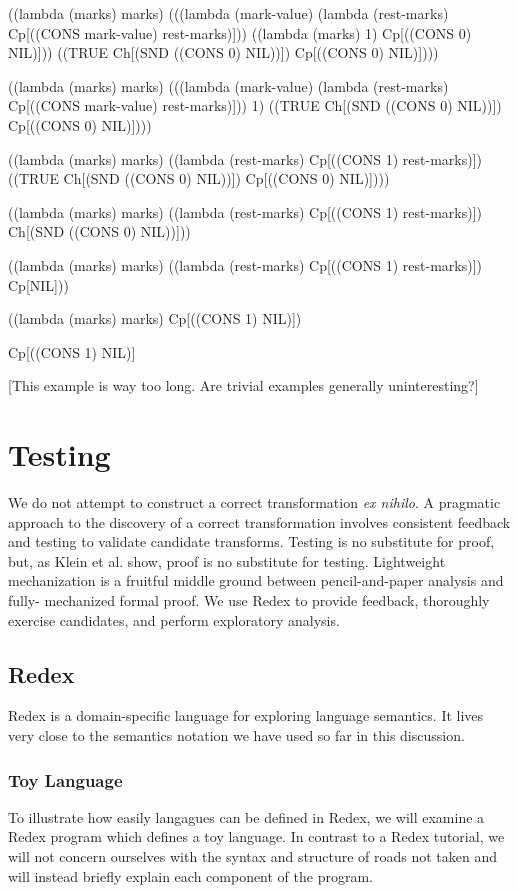 \documentclass[ms,electronic,twosidetoc,letterpaper,chaptercenter,parttop]{byumsphd}
\begin{document}
\begin{schemedisplay}
((lambda (marks) marks)
 (((lambda (mark-value) (lambda (rest-marks) Cp[((CONS mark-value) rest-marks)]))
   ((lambda (marks) 1) Cp[((CONS 0) NIL)]))
  ((TRUE Ch[(SND ((CONS 0) NIL))]) Cp[((CONS 0) NIL)])))

((lambda (marks) marks)
 (((lambda (mark-value) (lambda (rest-marks) Cp[((CONS mark-value) rest-marks)]))
   1)
  ((TRUE Ch[(SND ((CONS 0) NIL))]) Cp[((CONS 0) NIL)])))

((lambda (marks) marks)
 ((lambda (rest-marks) Cp[((CONS 1) rest-marks)])
  ((TRUE Ch[(SND ((CONS 0) NIL))]) Cp[((CONS 0) NIL)])))

((lambda (marks) marks)
 ((lambda (rest-marks) Cp[((CONS 1) rest-marks)])
  Ch[(SND ((CONS 0) NIL))]))

((lambda (marks) marks)
 ((lambda (rest-marks) Cp[((CONS 1) rest-marks)])
  Cp[NIL]))

((lambda (marks) marks)
 Cp[((CONS 1) NIL)])

Cp[((CONS 1) NIL)]
\end{schemedisplay}

[This example is way too long. Are trivial examples generally uninteresting?]

\chapter{Testing}

We do not attempt to construct a correct transformation \emph{ex nihilo}. A pragmatic
approach to the discovery of a correct transformation involves consistent feedback and
testing to validate candidate transforms. Testing is no substitute for proof, but, as
Klein et al. \cite{klein2012run} show, proof is no substitute for testing. Lightweight
mechanization is a fruitful middle ground between pencil-and-paper analysis and fully-
mechanized formal proof. We use Redex to provide feedback, thoroughly exercise candidates,
and perform exploratory analysis.

\section{Redex}

Redex \cite{findler2010redex} is a domain-specific language for exploring language
semantics. It lives very close to the semantics notation we have used so far in this
discussion.

\subsection{Toy Language}
To illustrate how easily langagues can be defined in Redex, we will examine a Redex
program which defines a toy language. In contrast to a Redex tutorial, we will not concern
ourselves with the syntax and structure of roads not taken and will instead briefly
explain each component of the program.
\end{document}
